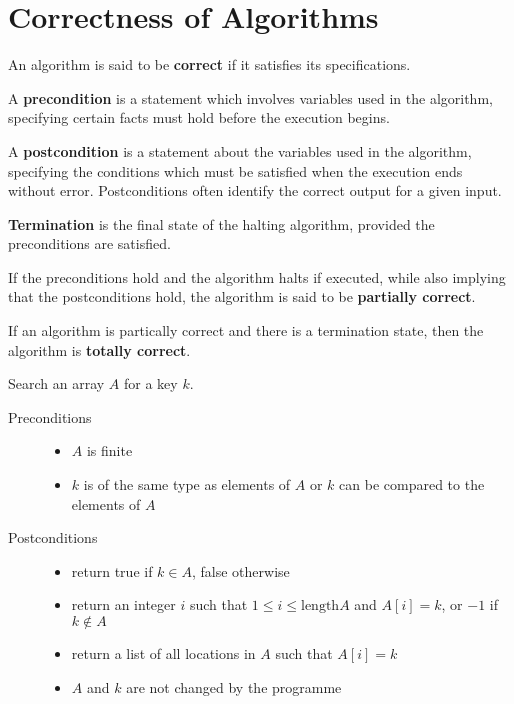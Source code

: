 \documentclass[11pt]{scrartcl}
\begin{document}
\section{Correctness of Algorithms}

An algorithm is said to be \textbf{correct} if it satisfies its
specifications.

A \textbf{precondition} is a statement which involves variables used
in the algorithm, specifying certain facts must hold before the
execution begins.

A \textbf{postcondition} is a statement about the variables used in
the algorithm, specifying the conditions which must be satisfied when
the execution ends without error. Postconditions often identify the
correct output for a given input.

\textbf{Termination} is the final state of the halting algorithm,
provided the preconditions are satisfied.

If the preconditions hold and the algorithm halts if executed, while also implying that the postconditions hold, the algorithm is said to be \textbf{partially correct}.

If an algorithm is partically correct and there is a termination
state, then the algorithm is \textbf{totally correct}.

\begin{problem*}
  Search an array $A$ for a key $k$.
\end{problem*}

\begin{description}

\item[Preconditions]\hfill
  
  \begin{itemize}
  \item $A$ is finite
  \item $k$ is of the same type as
    elements of $A$ or $k$ can be compared to the elements of $A$
  \end{itemize}
\item[Postconditions] \hfill
  
  \begin{itemize}
  \item return true if $k\in A$, false otherwise
  \item return an integer $i$ such that $1\leq i\leq \text{length} A$ and $A[i]=k$, or $-1$ if $k \not\in A$
  \item return a list of all locations in $A$ such that $A[i] = k$
  \item $A$ and $k$ are not changed by the programme
  \end{itemize}
\end{description}
\end{document}
